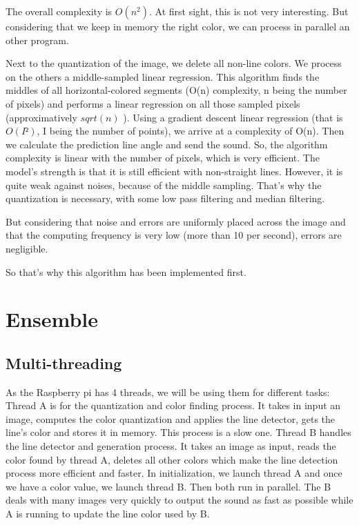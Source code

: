 \documentclass{article}
\begin{document}
The overall complexity is $O(n^2)$. At first sight, this is not very interesting. But considering that we keep in memory the right color, we can process in parallel an other program. 

Next to the quantization of the image, we delete all non-line colors. We process on the others a middle-sampled linear regression. This algorithm finds the middles of all horizontal-colored segments (O(n) complexity, n being the number of pixels) and performs a linear regression on all those sampled pixels (approximatively $sqrt(n)$ ). Using a gradient descent linear regression (that is $O(I²)$, I being the number of points), we arrive at a complexity of O(n). Then we calculate the prediction line angle and send the sound. So, the algorithm complexity is linear with the number of pixels, which is very efficient. 
The model’s strength is that it is still efficient with non-straight lines. However, it is quite weak against noises, because of the middle sampling. That’s why the quantization is necessary, with some low pass filtering and median filtering. 

But considering that noise and errors are uniformly placed across the image and that the computing frequency is very low (more than 10 per second), errors are negligible.  

So that’s why this algorithm has been implemented first. 

\section{Ensemble}
\subsection{Multi-threading}
As the Raspberry pi has 4 threads, we will be using them for different tasks: 
Thread A is for the quantization and color finding process. It takes in input an image, computes the color quantization and applies the line detector, gets the line’s color and stores it in memory. This process is a slow one. Thread B handles the line detector and generation process. It takes an image as input, reads the color found by thread A, deletes all other colors which make the line detection process more efficient and faster.
In initialization, we launch thread A and once we have a color value, we launch thread B. Then both run in parallel. The B deals with many images very quickly to output the sound as fast as possible while A is running to update the line color used by B.    
\end{document}
